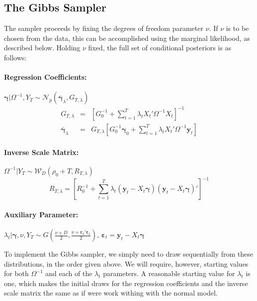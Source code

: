 \subsection{The Gibbs Sampler}
The sampler proceeds by fixing the degrees of freedom parameter $\nu$.
If $\nu$ is to be chosen from the data, this can be accomplished using the marginal likelihood, as described below.
Holding $\nu$ fixed, the full set of conditional posteriors is as follows:

\paragraph{Regression Coefficients:} 
$\boldsymbol{\gamma}|\Omega^{-1},Y_T \sim \mathcal{N}_p\left( \bar{\boldsymbol{\gamma}}_{\lambda},G_{T,\lambda} \right)$
\begin{eqnarray*}
	G_{T,\lambda} &=& \left[ G_0^{-1} + \sum_{t=1}^T \lambda_t X_t' \Omega^{-1} X_t \right]^{-1}\\
	\bar{\boldsymbol{\gamma}}_{\lambda} &=& G_{T,\lambda} \left[ G_0^{-1}\boldsymbol{\gamma}_0 + \sum_{t=1}^{T}\lambda_t X_t'\Omega^{-1}\mathbf{y}_t \right]
\end{eqnarray*}
\paragraph{Inverse Scale Matrix:}
$\Omega^{-1}|Y_T \sim \mathcal{W}_D\left(\rho_0 + T, R_{T,\lambda}\right)$
\begin{equation*}
R_{T,\lambda} = \left[ R_0^{-1} + \sum_{t=1}^{T} \lambda_t\left( \mathbf{y}_t - X_t \boldsymbol{\gamma} \right)\left( \mathbf{y}_t - X_t \boldsymbol{\gamma} \right)' \right]^{-1}
\end{equation*}

\paragraph{Auxiliary Parameter:} $\lambda_t|\boldsymbol{\gamma}, \nu, Y_T \sim G\left(\displaystyle \frac{\nu + D}{2}, \frac{\nu + \boldsymbol{\varepsilon}_t' \boldsymbol{\varepsilon}_t}{2} \right)$, $\boldsymbol{\varepsilon}_t = \mathbf{y}_t - X_t \boldsymbol{\gamma}$

To implement the Gibbs sampler, we simply need to draw sequentially from these distributions, in the order given above. 
We will require, however, starting values for both $\Omega^{-1}$ and each of the $\lambda_t$ parameters. 
A reasonable starting value for $\lambda_t$ is one, which makes the initial draws for the regression coefficients and the inverse scale matrix the same as if were work withing with the normal model.

